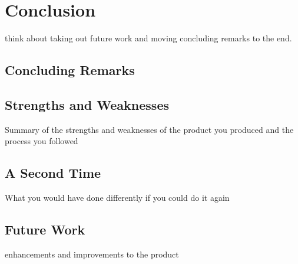 \section{Conclusion}

think about taking out future work and moving concluding remarks to the end.

\subsection{Concluding Remarks}


\subsection{Strengths and Weaknesses}
Summary of the strengths and weaknesses of the product you produced and the process you followed

\subsection{A Second Time}
What you would have done differently if you could do it again

\subsection{Future Work}
enhancements and improvements to the product